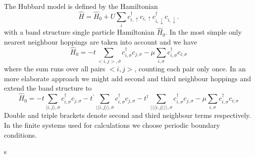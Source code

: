 \documentclass[a4paper,10pt]{report}
\begin{document}
The Hubbard model is defined by the Hamiltonian
\begin{equation}
 \hat{H} = \hat{H}_0
	   + U \sum_i c^{\dagger}_{i,\uparrow}c_{i,\uparrow} c^{\dagger}_{i,\downarrow}c_{i,\downarrow} 
	    . \label{Hubbard_space}
\end{equation}
with a band structure single particle Hamiltonian $\hat{H}_0$.
In the most simple only nearest neighbour hoppings are taken into account and we have 
\begin{equation}
 \hat{H}_0 = - t \sum_{<i,j>,\sigma} c^{\dagger}_{i,\sigma}c_{j,\sigma} 	    -\mu \sum_{i,\sigma} c^{\dagger}_{i,\sigma}c_{i;\sigma}
\end{equation}
where the sum runs over all pairs $<i,j>$, counting each pair only once. 
In an more elaborate approach we might add second and third neighbour hoppings and extend the band structure to
\begin{equation}
 \hat{H}_0 = - t \sum_{\langle i,j \rangle,\sigma} c^{\dagger}_{i,\sigma}c_{j,\sigma}  - t^{\prime} \sum_{\langle \langle i,j \rangle \rangle ,\sigma} c^{\dagger}_{i,\sigma}c_{j,\sigma} 
 - t^{\dagger} \sum_{\langle \langle \langle i,j \rangle \rangle \rangle ,\sigma} c^{\dagger}_{i,\sigma}c_{j,\sigma}  	    -\mu \sum_{i,\sigma} c^{\dagger}_{i,\sigma}c_{i;\sigma}
\end{equation}
Double and triple brackets denote second and third neighbour terms respectively. 
In the finite systems used for calculations we choose periodic boundary conditions.


s
\end{document}
